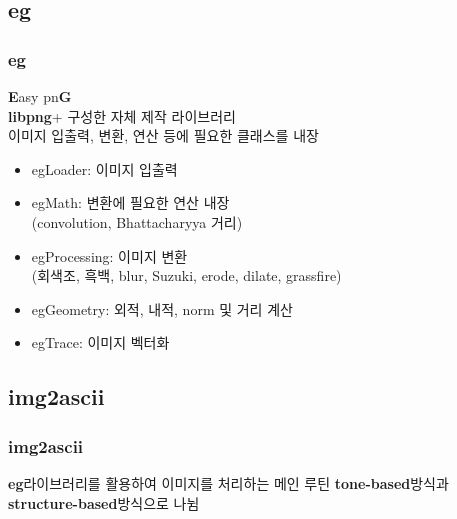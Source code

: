 \documentclass{beamer}
\newcommand{\spacing}{\hspace{0.3em}}
\newcommand{\eg}{\textbf{eg}}
\newcommand{\imgascii}{\textbf{img2ascii}}
\newcommand{\libpng}{\textbf{libpng}}
\newcommand{\Eigen}{\textbf{Eigen}}
\newcommand{\tonebased}{\textbf{tone-based}}
\newcommand{\structurebased}{\textbf{structure-based}}
\begin{document}
	\subsection{\eg}
	\begin{frame}{}
		\frametitle{\eg}
		\textbf{E}asy pn\textbf{G} \\
		\libpng \spacing +  구성한 자체 제작 라이브러리 \\
		이미지 입출력, 변환, 연산 등에 필요한 클래스를 내장
		\vspace{1em}
		\begin{itemize}
			\item egLoader: 이미지 입출력
			\item egMath: 변환에 필요한 연산 내장 \\ (convolution, Bhattacharyya 거리)
			\item egProcessing: 이미지 변환 \\ (회색조, 흑백, blur, Suzuki, erode, dilate, grassfire)
			\item egGeometry: 외적, 내적, norm 및 거리 계산
			\item egTrace: 이미지 벡터화
		\end{itemize}
	\end{frame}

	\subsection{\imgascii}
	\begin{frame}{}
		\frametitle{\imgascii}
		\eg \spacing 라이브러리를 활용하여 이미지를 처리하는 메인 루틴
		\tonebased \spacing 방식과 \structurebased \spacing 방식으로 나뉨
	\end{frame}
\end{document}
